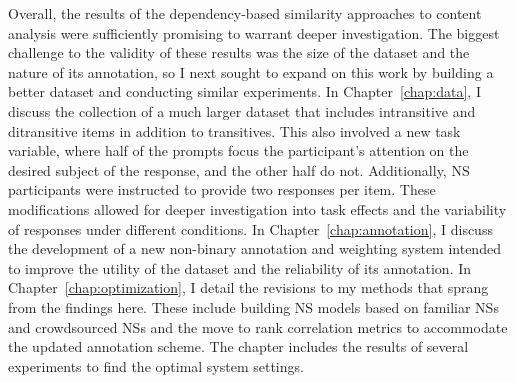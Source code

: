 Overall, the results of the dependency-based similarity approaches to content analysis were sufficiently promising to warrant deeper investigation. The biggest challenge to the validity of these results was the size of the dataset and the nature of its annotation, so I next sought to expand on this work by building a better dataset and conducting similar experiments. In Chapter~\ref{chap:data}, I discuss the collection of a much larger dataset that includes intransitive and ditransitive items in addition to transitives. This also involved a new task variable, where half of the prompts focus the participant's attention on the desired subject of the response, and the other half do not. Additionally, NS participants were instructed to provide two responses per item. These modifications allowed for deeper investigation into task effects and the variability of responses under different conditions. In Chapter~\ref{chap:annotation}, I discuss the development of a new non-binary annotation and weighting system intended to improve the utility of the dataset and the reliability of its annotation. In Chapter~\ref{chap:optimization}, I detail the revisions to my methods that sprang from the findings here. These include building NS models based on familiar NSs and crowdsourced NSs and the move to rank correlation metrics to accommodate the updated annotation scheme. The chapter includes the results of several experiments to find the optimal system settings.

